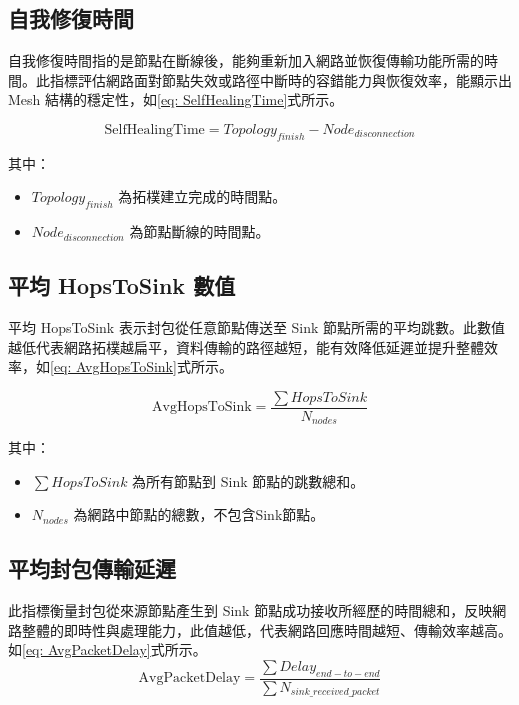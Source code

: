 \begin{ZhChapter}
\subsection{自我修復時間}
自我修復時間指的是節點在斷線後，能夠重新加入網路並恢復傳輸功能所需的時間。此指標評估網路面對節點失效或路徑中斷時的容錯能力與恢復效率，能顯示出 Mesh 結構的穩定性，如\ref{eq: SelfHealingTime}式所示。

\begin{equation}
\label{eq: SelfHealingTime}
\text{SelfHealingTime} = Topology_{finish} - Node_{disconnection}
\end{equation}

其中：
\begin{itemize}
    \item $Topology_{finish}$ 為拓樸建立完成的時間點。
    \item $Node_{disconnection}$ 為節點斷線的時間點。
\end{itemize}

\subsection{平均 HopsToSink 數值}
平均 HopsToSink 表示封包從任意節點傳送至 Sink 節點所需的平均跳數。此數值越低代表網路拓樸越扁平，資料傳輸的路徑越短，能有效降低延遲並提升整體效率，如\ref{eq: AvgHopsToSink}式所示。

\begin{equation}
\label{eq: AvgHopsToSink}
\text{AvgHopsToSink} = \frac{\sum HopsToSink}{N_{nodes}}
\end{equation}

其中：
\begin{itemize}
    \item $\sum HopsToSink$ 為所有節點到 Sink 節點的跳數總和。
    \item $N_{nodes}$ 為網路中節點的總數，不包含Sink節點。
\end{itemize}

\subsection{平均封包傳輸延遲}
此指標衡量封包從來源節點產生到 Sink 節點成功接收所經歷的時間總和，反映網路整體的即時性與處理能力，此值越低，代表網路回應時間越短、傳輸效率越高。如\ref{eq: AvgPacketDelay}式所示。
\begin{equation}
\label{eq: AvgPacketDelay}
\text{AvgPacketDelay} = \frac{\sum Delay_{end-to-end}}{\sum N_{sink\_received\_packet}}
\end{equation}


\end{ZhChapter}
